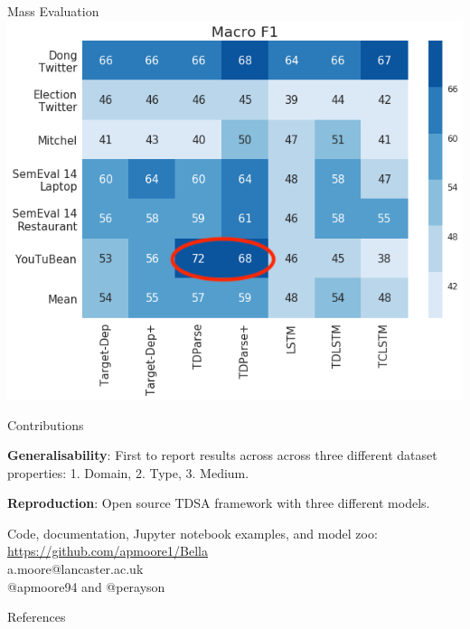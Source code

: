 \documentclass[10pt]{beamer}
\newenvironment{packed_enum}{
\begin{enumerate}
  \setlength{\itemsep}{20pt}
  \setlength{\parskip}{0pt}
  \setlength{\parsep}{0pt}
}{\end{enumerate}}
\begin{document}
\begin{frame}{Mass Evaluation}
\centering
\includegraphics[scale=0.45]{mass_eval2.png}
\end{frame}


\begin{frame}[t]{Contributions}
\vspace{1cm}
\centering
    \begin{packed_enum}
        \item \textbf{Generalisability}: First to report results across across three different dataset properties: 1. Domain, 2. Type, 3. Medium.
        \item \textbf{Reproduction}: Open source TDSA framework with three different models.
    \end{packed_enum}
    \vspace{10pt}
    Code, documentation, Jupyter notebook examples, and model zoo:
    \url{https://github.com/apmoore1/Bella}\\
    \vspace{10pt}
    a.moore@lancaster.ac.uk\\
    @apmoore94 and @perayson
\end{frame}



\begin{frame}{References}
  \printbibliography[heading=none]
\end{frame}
\end{document}
